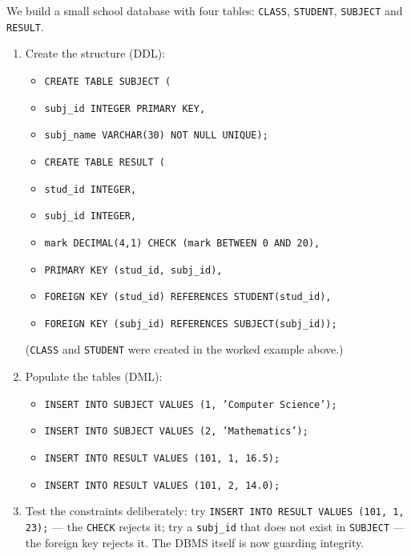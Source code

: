 \documentclass[11pt]{article}
\begin{document}
\begin{experience}
We build a small school database with four tables: \texttt{CLASS}, \texttt{STUDENT}, \texttt{SUBJECT} and \texttt{RESULT}.
\begin{enumerate}
\item Create the structure (DDL):
\begin{itemize}
\item[] \texttt{CREATE TABLE SUBJECT (}
\item[] \texttt{\quad subj\_id INTEGER PRIMARY KEY,}
\item[] \texttt{\quad subj\_name VARCHAR(30) NOT NULL UNIQUE);}
\item[] \texttt{CREATE TABLE RESULT (}
\item[] \texttt{\quad stud\_id INTEGER,}
\item[] \texttt{\quad subj\_id INTEGER,}
\item[] \texttt{\quad mark DECIMAL(4,1) CHECK (mark BETWEEN 0 AND 20),}
\item[] \texttt{\quad PRIMARY KEY (stud\_id, subj\_id),}
\item[] \texttt{\quad FOREIGN KEY (stud\_id) REFERENCES STUDENT(stud\_id),}
\item[] \texttt{\quad FOREIGN KEY (subj\_id) REFERENCES SUBJECT(subj\_id));}
\end{itemize}
(\texttt{CLASS} and \texttt{STUDENT} were created in the worked example above.)
\item Populate the tables (DML):
\begin{itemize}
\item[] \texttt{INSERT INTO SUBJECT VALUES (1, 'Computer Science');}
\item[] \texttt{INSERT INTO SUBJECT VALUES (2, 'Mathematics');}
\item[] \texttt{INSERT INTO RESULT VALUES (101, 1, 16.5);}
\item[] \texttt{INSERT INTO RESULT VALUES (101, 2, 14.0);}
\end{itemize}
\item Test the constraints deliberately: try \texttt{INSERT INTO RESULT VALUES (101, 1, 23);} — the \texttt{CHECK} rejects it; try a \texttt{subj\_id} that does not exist in \texttt{SUBJECT} — the foreign key rejects it. The DBMS itself is now guarding integrity.
\end{enumerate}
\end{experience}
\end{document}

